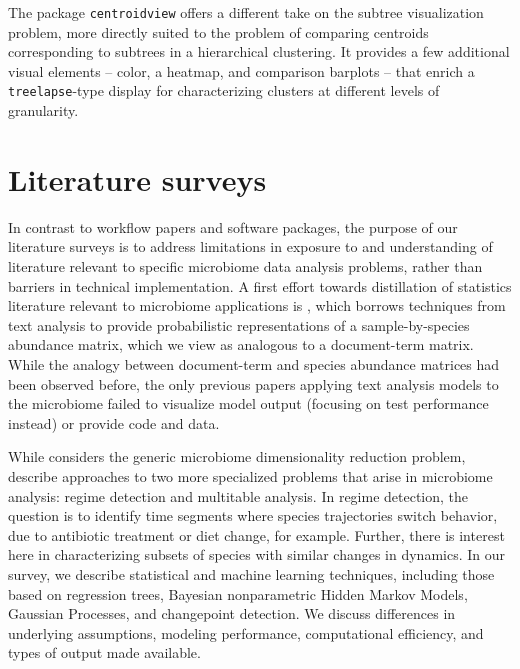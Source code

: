 \documentclass{article}
\begin{document}
The package \texttt{centroidview} offers a different take on the subtree
visualization problem, more directly suited to the problem of comparing
centroids corresponding to subtrees in a hierarchical clustering. It provides a
few additional visual elements -- color, a heatmap, and comparison barplots --
that enrich a \texttt{treelapse}-type display for characterizing clusters at
different levels of granularity.

\section{Literature surveys}

In contrast to workflow papers and software packages, the purpose of our
literature surveys is to address limitations in exposure to and understanding of
literature relevant to specific microbiome data analysis problems, rather than
barriers in technical implementation. A first effort towards distillation of
statistics literature relevant to microbiome applications is
\citep{sankaran2017latent}, which borrows techniques from text analysis to
provide probabilistic representations of a sample-by-species abundance matrix,
which we view as analogous to a document-term matrix. While the analogy between
document-term and species abundance matrices had been observed before, the only
previous papers applying text analysis models to the microbiome failed to
visualize model output (focusing on test performance instead) or provide code
and data.

While \citep{sankaran2017latent} considers the generic microbiome dimensionality
reduction problem, \citep{sankaran2017inference, sankaran2017survey} describe
approaches to two more specialized problems that arise in microbiome analysis:
regime detection and multitable analysis. In regime detection, the question is
to identify time segments where species trajectories switch behavior, due to
antibiotic treatment or diet change, for example. Further, there is interest
here in characterizing subsets of species with similar changes in dynamics. In
our survey, we describe statistical and machine learning techniques, including
those based on regression trees, Bayesian nonparametric Hidden Markov Models,
Gaussian Processes, and changepoint detection. We discuss differences in
underlying assumptions, modeling performance, computational efficiency, and
types of output made available.
\end{document}
